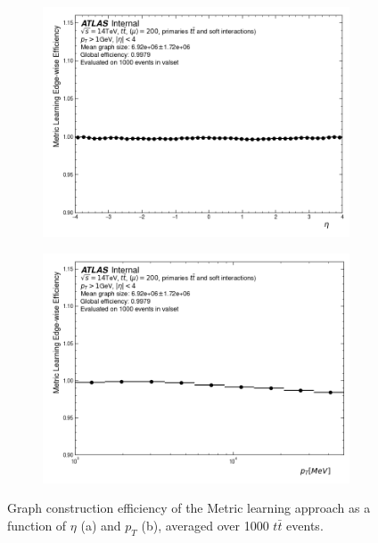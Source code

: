 \begin{figure}[h!]
\begin{subfigure}[b]{0.49\textwidth}
    \centering
    \includegraphics[width=\textwidth]{figures/metric_learning_eff_eta.png}
    \caption{}
    \label{subfig:metric-learning-eff-eta}
\end{subfigure}
\begin{subfigure}[b]{0.49\textwidth}
    \centering
    \includegraphics[width=\textwidth]{figures/metric_learning_eff_pt.png}
    \caption{}
    \label{subfig:metric-learning-eff-pt}
\end{subfigure}
\caption{Graph construction efficiency of the Metric learning approach as a function of $\eta$ (a) and $p_T$ (b), averaged over 1000 $t\bar{t}$ events. }
\label{fig:metric-learning-efficiency}
\end{figure}

